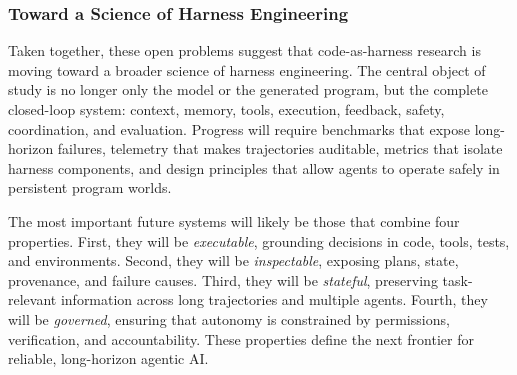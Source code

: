 \subsubsection{Toward a Science of Harness Engineering}

Taken together, these open problems suggest that code-as-harness research is moving toward a broader science of harness engineering. The central object of study is no longer only the model or the generated program, but the complete closed-loop system: context, memory, tools, execution, feedback, safety, coordination, and evaluation. Progress will require benchmarks that expose long-horizon failures, telemetry that makes trajectories auditable, metrics that isolate harness components, and design principles that allow agents to operate safely in persistent program worlds.

The most important future systems will likely be those that combine four properties. First, they will be \emph{executable}, grounding decisions in code, tools, tests, and environments. Second, they will be \emph{inspectable}, exposing plans, state, provenance, and failure causes. Third, they will be \emph{stateful}, preserving task-relevant information across long trajectories and multiple agents. Fourth, they will be \emph{governed}, ensuring that autonomy is constrained by permissions, verification, and accountability. These properties define the next frontier for reliable, long-horizon agentic AI.
